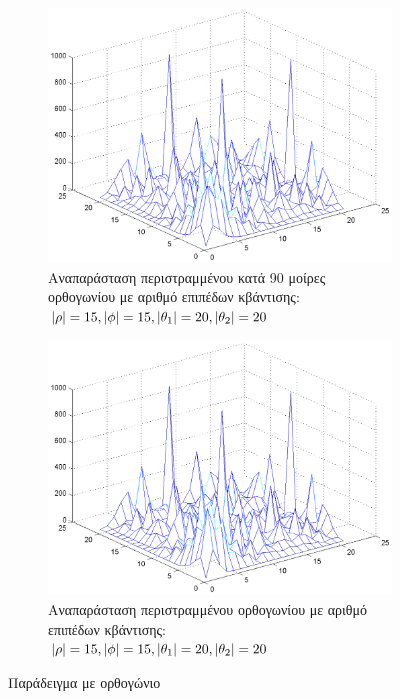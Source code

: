 \begin{figure}
\ContinuedFloat
        \centering
        \begin{subfigure}[b]{1\textwidth}
                \centerline{\includegraphics[scale = 0.3]{./images/examples/orthogwnio90(15152020).png}}
                \caption{Αναπαράσταση περιστραμμένου κατά 90 μοίρες ορθογωνίου με αριθμό επιπέδων κβάντισης: $\lvert\rho\rvert = 15,\lvert\phi\rvert = 15,\lvert\theta_1\rvert = 20,\lvert\theta_2\rvert = 20$}
        \end{subfigure}%

        \centering
        \begin{subfigure}[b]{1\textwidth}
                \centerline{\includegraphics[scale = 0.3]{./images/examples/Rotatedorthogwnio(15152020).png}}
                \caption{Αναπαράσταση περιστραμμένου ορθογωνίου με αριθμό επιπέδων κβάντισης: $\lvert\rho\rvert = 15,\lvert\phi\rvert = 15,\lvert\theta_1\rvert = 20,\lvert\theta_2\rvert = 20$}
        \end{subfigure}%
        \caption{Παράδειγμα με ορθογώνιο}
        \label{fig:ex__rect}
\end{figure}

